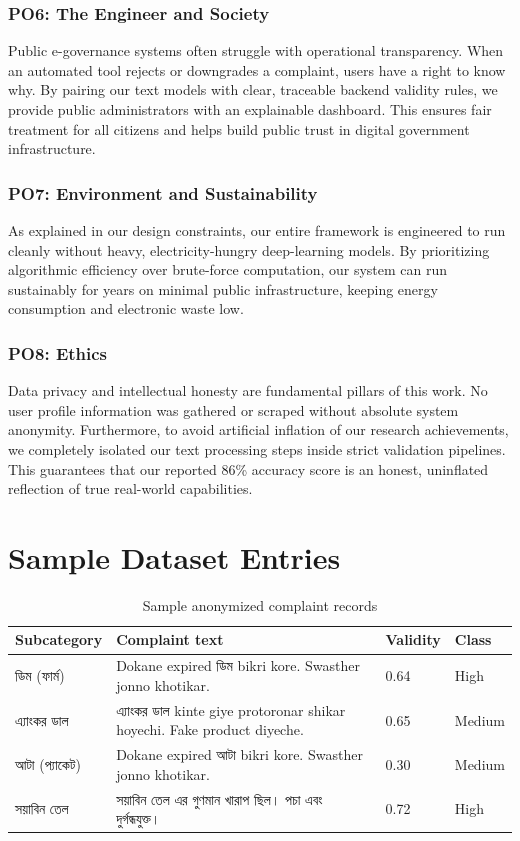 \documentclass[12pt,a4paper,openany]{book}
\newcommand{\bn}[1]{{\banglafont #1}}
\newcommand{\bn}[1]{#1}
\begin{document}
\subsection{PO6: The Engineer and Society}
Public e-governance systems often struggle with operational transparency. When an automated tool rejects or downgrades a complaint, users have a right to know why. By pairing our text models with clear, traceable backend validity rules, we provide public administrators with an explainable dashboard. This ensures fair treatment for all citizens and helps build public trust in digital government infrastructure.

\subsection{PO7: Environment and Sustainability}
As explained in our design constraints, our entire framework is engineered to run cleanly without heavy, electricity-hungry deep-learning models. By prioritizing algorithmic efficiency over brute-force computation, our system can run sustainably for years on minimal public infrastructure, keeping energy consumption and electronic waste low.

\subsection{PO8: Ethics}
Data privacy and intellectual honesty are fundamental pillars of this work. No user profile information was gathered or scraped without absolute system anonymity. Furthermore, to avoid artificial inflation of our research achievements, we completely isolated our text processing steps inside strict validation pipelines. This guarantees that our reported 86\% accuracy score is an honest, uninflated reflection of true real-world capabilities.


\appendix

\chapter{Sample Dataset Entries}
\begin{longtable}{p{}p{}p{}p{}}
\caption{Sample anonymized complaint records}\\
\toprule
\textbf{Subcategory} & \textbf{Complaint text} & \textbf{Validity} & \textbf{Class}\\
\midrule
\bn{ডিম (ফার্ম)} & Dokane expired \bn{ডিম} bikri kore. Swasther jonno khotikar. & 0.64 & High\\
\bn{এ্যাংকর ডাল} & \bn{এ্যাংকর ডাল} kinte giye protoronar shikar hoyechi. Fake product diyeche. & 0.65 & Medium\\
\bn{আটা (প্যাকেট)} & Dokane expired \bn{আটা} bikri kore. Swasther jonno khotikar. & 0.30 & Medium\\
\bn{সয়াবিন তেল} & \bn{সয়াবিন তেল এর গুণমান খারাপ ছিল। পচা এবং দুর্গন্ধযুক্ত।} & 0.72 & High\\
\bottomrule
\end{longtable}
\end{document}
